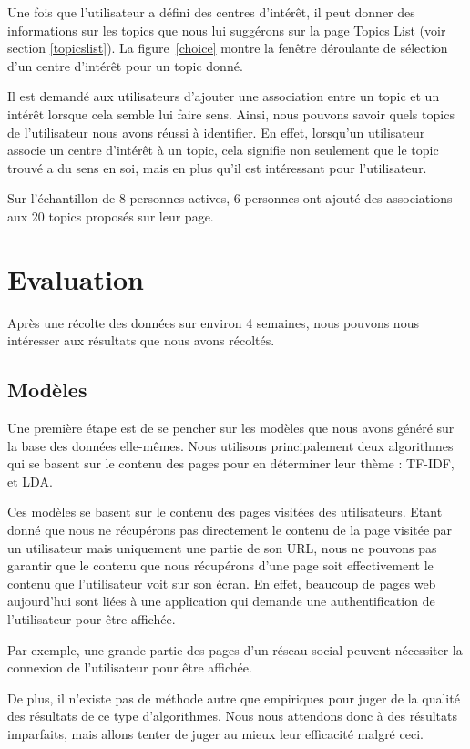 			Une fois que l'utilisateur a défini des centres d'intérêt, il peut donner des informations sur les topics que nous lui suggérons sur la page Topics List (voir section \ref{topicslist}). La figure~\ref{choice} montre la fenêtre déroulante de sélection d'un centre d'intérêt pour un topic donné.

			Il est demandé aux utilisateurs d'ajouter une association entre un topic et un intérêt lorsque cela semble lui faire sens. Ainsi, nous pouvons savoir quels topics de l'utilisateur nous avons réussi à identifier. En effet, lorsqu'un utilisateur associe un centre d'intérêt à un topic, cela signifie non seulement que le topic trouvé a du sens en soi, mais en plus qu'il est intéressant pour l'utilisateur.

			Sur l'échantillon de 8 personnes actives, 6 personnes ont ajouté des associations aux 20 topics proposés sur leur page. 

\section{Evaluation}

	Après une récolte des données sur environ 4 semaines, nous pouvons nous intéresser aux résultats que nous avons récoltés.

	\subsection{Modèles}

		Une première étape est de se pencher sur les modèles que nous avons généré sur la base des données elle-mêmes. Nous utilisons principalement deux algorithmes qui se basent sur le contenu des pages pour en déterminer leur thème : TF-IDF, et LDA.

		Ces modèles se basent sur le contenu des pages visitées des utilisateurs. Etant donné que nous ne récupérons pas directement le contenu de la page visitée par un utilisateur mais uniquement une partie de son URL, nous ne pouvons pas garantir que le contenu que nous récupérons d'une page soit effectivement le contenu que l'utilisateur voit sur son écran. En effet, beaucoup de pages web aujourd'hui sont liées à une application qui demande une authentification de l'utilisateur pour être affichée.

		Par exemple, une grande partie des pages d'un réseau social peuvent nécessiter la connexion de l'utilisateur pour être affichée.

		De plus, il n'existe pas de méthode autre que empiriques pour juger de la qualité des résultats de ce type d'algorithmes. Nous nous attendons donc à des résultats imparfaits, mais allons tenter de juger au mieux leur efficacité malgré ceci.

